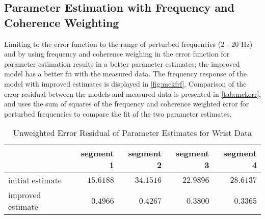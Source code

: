 \documentclass[11pt,a4paper]{article}
\begin{document}
\subsection{Parameter Estimation with Frequency and Coherence Weighting}
Limiting to the error function to the range of perturbed frequencies ($2$ -
$20$ Hz) and by using frequency and coherence weighing in the error function
for parameter estimation results in a better parameter estimates; the improved
model has a better fit with the measured data. The frequency response of the
model with improved estimates is displayed in \autoref{fig:mckfrf}. Comparison
of the error residual between the models and measured data is presented in
\autoref{tab:mckerr}, and uses the sum of squares of the frequency and
coherence weighted error for perturbed frequencies to compare the fit of the
two parameter estimates.

\begin{table}[hb]
    \centering
    \begin{tabular}{|l|r|r|r|r|}
        \hline
        \nonumber & segment 1 & segment 2 & segment 3 & segment 4 \\
        \hline
        initial estimate & $15.6188$ & $34.1516$ & $22.9896$ & $28.6137$ \\
        improved estimate & $0.4966$ & $0.4267$ & $0.3800$ & $0.3365$ \\
        \hline
    \end{tabular}
    \caption{Unweighted Error Residual of Parameter Estimates for Wrist Data}
    \label{tab:mckerr}
\end{table}

\end{document}
